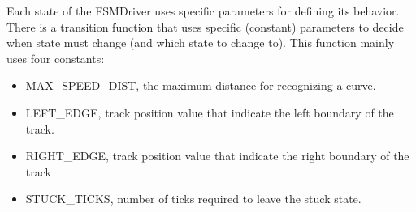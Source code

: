 Each state of the FSMDriver uses specific parameters for defining its behavior. 
There is a transition function that uses specific (constant) parameters to decide 
when state must change (and which state to change to). This function mainly uses four constants:
\begin{itemize}
\item MAX\_SPEED\_DIST, the maximum distance for recognizing a curve.
\item LEFT\_EDGE, track position value that indicate the left boundary of the track.
\item RIGHT\_EDGE, track position value that indicate the right boundary of the track
\item STUCK\_TICKS, number of ticks required to leave the stuck state.
\end{itemize}